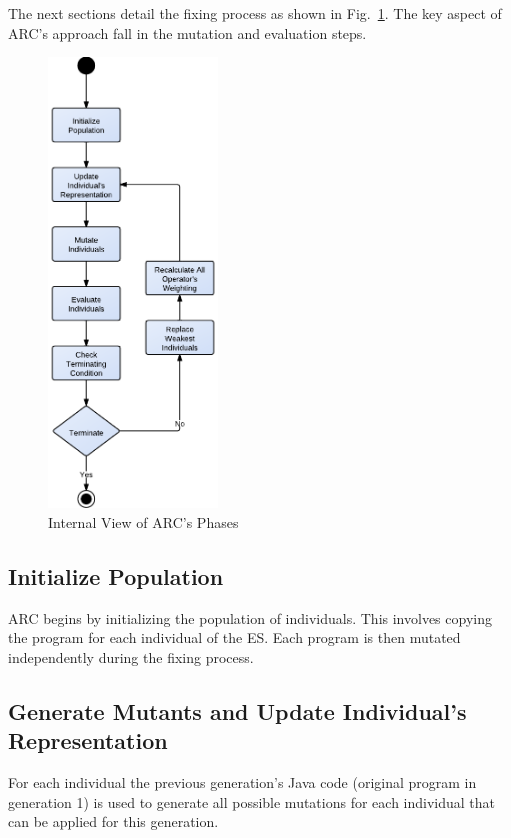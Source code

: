 \documentclass{llncs}
\begin{document}
The next sections detail the fixing process as shown in Fig.~\ref{fig:phases_internals}.
The key aspect of ARC's approach fall in the mutation and evaluation steps.

\begin{figure}[h]
  \centering
  \includegraphics[width=4.50cm]{figures/phases.pdf}
  \caption{Internal View of ARC's Phases}
  \label{fig:phases_internals}
\end{figure}

\subsection{Initialize Population}
\label{sec:initialize_population}

ARC begins by initializing the population of individuals. This
involves copying the program for each individual of the ES.  Each program
is then mutated independently during the fixing process.

\subsection{Generate Mutants and Update Individual's Representation}
\label{sec:update_individual_representation}

For each individual the previous generation's Java code (original program in generation 1)
 is used to generate all
possible mutations for each individual that can be applied for this generation.
\end{document}

